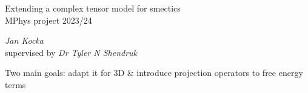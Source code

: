 \documentclass[10pt,mathserif]{beamer}
\begin{document}
\setlength{\abovedisplayskip}{1em}
\setlength{\belowdisplayskip}{0ex}


\begin{frame}
    \centering
    \vspace{2em}
    \Large
    Extending a complex tensor model for smectics \\
    \normalsize
    \vspace{0.5em}
    MPhys project 2023/24 \\

    \vspace{2em}

    \emph{Jan Kocka} \\
    \footnotesize supervised by \emph{Dr Tyler N Shendruk}

    \vspace{3em}

    \small
    Two main goals: adapt it for 3D \hspace{1ex}\&\hspace{1ex} introduce projection operators to free energy terms
\end{frame}
\end{document}
